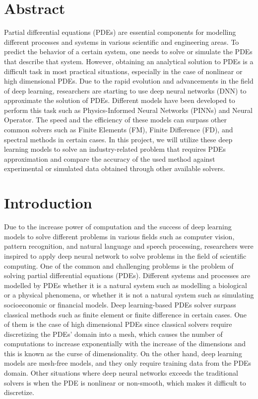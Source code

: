 \documentclass[a4paper, onecolumn, 12pt]{article}
\begin{document}

\onehalfspacing %
\section*{Abstract}
Partial differential equations (PDEs) are essential components for modelling different processes 
and systems in various scientific and engineering areas. To predict the behavior of a certain system, 
one needs to solve or simulate the PDEs that describe that system. However, 
obtaining an analytical solution to PDEs is a difficult task in most practical situations, 
especially in the case of nonlinear or high dimensional PDEs. 
Due to the rapid evolution and advancements in the field of deep learning, 
researchers are starting to use deep neural networks (DNN) to approximate the solution of PDEs. 
Different models have been developed to perform this task such as Physics-Informed Neural Networks (PINNs) 
and Neural Operator. The speed and the efficiency of these models can surpass other common solvers 
such as Finite Elements (FM), Finite Difference (FD), and spectral methods in certain cases. 
In this project, we will utilize these deep learning models to solve an industry-related problem that 
requires PDEs approximation and compare the accuracy of the used method against 
experimental or simulated data obtained through other available solvers.

\section{Introduction}
Due to the increase power of computation and the success of deep learning models to 
solve different problems in various fields such
as computer vision\cite{chai2021deep}, pattern recognition\cite{serey2023pattern}, 
and natural language and speech processing\cite{NLPChai}, 
researchers were inspired to apply deep neural network to solve problems in the field of scientific computing. 
One of the common and challenging problems is the problem of solving partial differential equations (PDEs).
Different systems and processes are modelled by PDEs whether it is a natural system such as 
modelling a biological or a physical phenomena\cite{grossmann2023can,beck2020overview}, or whether it is not a natural system such as
simulating socioeconomic or financial models\cite{beck2020overview}. Deep learning-based PDEs solver surpass classical methods such as 
finite element or finite difference in certain cases\cite{grossmann2023can}. 
One of them is the case of high dimensional PDEs since classical solvers require discretizing the PDEs' domain into a mesh, 
which causes the number of computations to increase exponentially with the increase of the dimensions and this is known as the curse of dimensionality. 
On the other hand, deep learning models are mesh-free models, and they only require training data from the PDEs domain. 
Other situations where deep neural networks exceeds the traditional solvers is when the PDE is 
nonlinear or non-smooth, which makes it difficult to discretize\cite{grossmann2023can}. 
\end{document}
